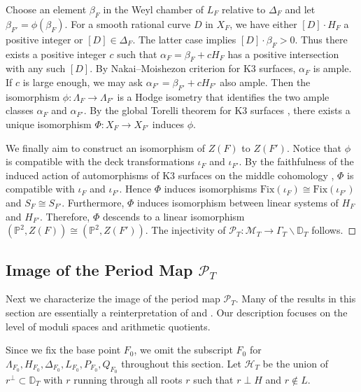 \documentclass[
]{article}
\begin{document}
Choose an element \(\beta_F\) in the Weyl chamber of \(L_F\) relative to
\(\Delta_F\) and let \(\beta_{F'}=\phi(\beta_F)\). For a smooth rational
curve \(D\) in \(X_F\), we have either \([D]\cdot H_F\) a positive
integer or \([D]\in \Delta_F\). The latter case implies
\([D]\cdot \beta_F>0\). Thus there exists a positive integer \(c\) such
that \(\alpha_F=\beta_F+cH_F\) has a positive intersection with any such
\([D]\). By Nakai--Moishezon criterion for K3 surfaces, \(\alpha_F\) is
ample. If \(c\) is large enough, we may ask
\(\alpha_{F'}=\beta_{F'}+cH_{F'}\) also ample. Then the isomorphism
\(\phi\colon \Lambda_F\to \Lambda_{F'}\) is a Hodge isometry that
identifies the two ample classes \(\alpha_F\) and \(\alpha_{F'}\). By
the global Torelli theorem for K3 surfaces \cite{burns1975torelli},
there exists a unique isomorphism \(\Phi\colon X_F\to X_{F'}\) induces
\(\phi\).

We finally aim to construct an isomorphism of \(Z(F)\) to \(Z(F')\).
Notice that \(\phi\) is compatible with the deck transformations
\(\iota_F\) and \(\iota_{F'}\). By the faithfulness of the induced
action of automorphisms of K3 surfaces on the middle cohomology
\cite{looijenga1980torelli}, \(\Phi\) is compatible with \(\iota_F\) and
\(\iota_{F'}\). Hence \(\Phi\) induces isomorphisms
\(\mathrm{Fix}(\iota_F)\cong \mathrm{Fix}(\iota_{F'})\) and
\(S_F\cong S_{F'}\). Furthermore, \(\Phi\) induces isomorphism between
linear systems of \(H_F\) and \(H_{F'}\). Therefore, \(\Phi\) descends
to a linear isomorphism
\((\mathbb{P}^2, Z(F))\cong (\mathbb{P}^2, Z(F'))\). The injectivity of
\(\mathscr{P}_T\colon\mathcal{M}_T\to \Gamma_T\backslash \mathbb{D}_T\)
follows.~◻

\subsection{\texorpdfstring{Image of the Period Map
\(\mathscr{P}_T\)}{Image of the Period Map \textbackslash mathscr\{P\}\_T}}\label{subsec:ux20imageux20ofux20periodux20map}

Next we characterize the image of the period map \(\mathscr{P}_T\). Many
of the results in this section are essentially a reinterpretation of
\cite[Theorem 1.16]{urabe1988combinations} and
\cite[Theorem 3.4.1]{degtyarev2008deformations}. Our description focuses
on the level of moduli spaces and arithmetic quotients.

Since we fix the base point \(F_0\), we omit the subscript \(F_0\) for
\(\Lambda_{F_0},H_{F_0},\Delta_{F_0},L_{F_0},P_{F_0},Q_{F_0}\)
throughout this section. Let \(\mathcal{H}_T\) be the union of
\(r^{\perp}\subset \mathbb{D}_T\) with \(r\) running through all roots
\(r\) such that \(r\perp H\) and \(r\notin L\).
\end{document}
